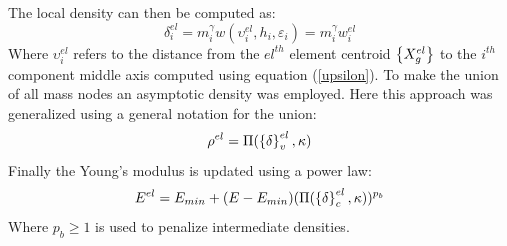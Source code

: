The local density can then be computed as:
\begin{equation}
     \delta^{el}_i=m_i^\gamma w(\upsilon^{el}_i,h_i,\varepsilon_i)=m_i^\gamma w_i^{el}
\end{equation}
Where  $\upsilon^{el}_i$ refers to the distance from the $el^{th}$ element centroid $\left\{{X_g^{el}}\right\}$ to the $i^{th}$ component middle axis computed using equation (\ref{upsilon}).
To make the union of all mass nodes an asymptotic density was employed. Here this approach was generalized using a general notation for the union:
\begin{equation}
    \rho^{el}=\Pi(\left\{{\delta}\right\}_v^{el},\kappa)
\end{equation}
Finally the Young's modulus is updated using a power law:
\begin{equation}
    E^{el}=E_{min} + (E-E_{min})(\Pi(\left\{{\delta}\right\}_c^{el},\kappa))^{p_b}
\end{equation}
Where $p_b\geq1$ is used to penalize intermediate densities.

